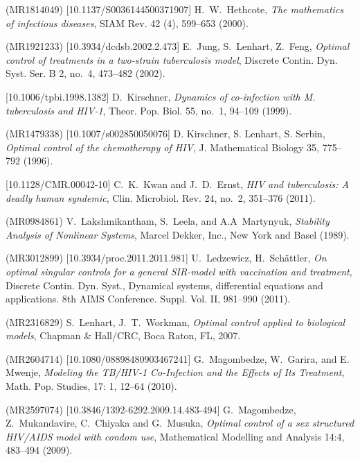 \documentclass{my_aims}
\theoremstyle{definition}
\begin{document}
\begin{thebibliography}{99}
 (MR1814049) [10.1137/S0036144500371907]
\newblock H.~W.~Hethcote,
\newblock \emph{The mathematics of infectious diseases},
\newblock SIAM Rev. 42 (4), 599--653 (2000).

 (MR1921233) [10.3934/dcdsb.2002.2.473]
\newblock E.~Jung, S.~Lenhart, Z.~Feng,
\newblock \emph{Optimal control of treatments in a two-strain tuberculosis model},
\newblock Discrete Contin. Dyn. Syst. Ser. B 2, no.~4, 473--482 (2002).

 [10.1006/tpbi.1998.1382]
\newblock D.~Kirschner,
\newblock \emph{Dynamics of co-infection with M. tuberculosis and HIV-1},
\newblock Theor. Pop. Biol. 55, no.~1, 94--109 (1999).

 (MR1479338) [10.1007/s002850050076]
\newblock D. Kirschner, S. Lenhart, S. Serbin,
\newblock \emph{Optimal control of the chemotherapy of HIV},
\newblock J. Mathematical Biology 35, 775--792 (1996).

 [10.1128/CMR.00042-10]
\newblock C.~K.~Kwan and J.~D.~Ernst,
\newblock \emph{HIV and tuberculosis: A deadly human syndemic},
\newblock Clin. Microbiol. Rev. 24, no.~2, 351--376 (2011).

 (MR0984861)
\newblock V.~Lakshmikantham, S.~Leela, and A.A~Martynyuk,
\newblock \emph{Stability Analysis of Nonlinear Systems},
\newblock Marcel Dekker, Inc., New York and Basel (1989).

 (MR3012899) [10.3934/proc.2011.2011.981]
\newblock U.~Ledzewicz, H.~Sch\"attler,
\newblock \emph{On optimal singular controls for a general
SIR-model with vaccination and treatment},
\newblock Discrete Contin. Dyn. Syst.,
\newblock Dynamical systems, differential equations and applications.
\newblock 8th AIMS Conference. Suppl. Vol. II, 981--990 (2011).

 (MR2316829)
\newblock S.~Lenhart, J.~T.~Workman,
\newblock \emph{Optimal control applied to biological models},
\newblock Chapman \& Hall/CRC, Boca Raton, FL, 2007.

 (MR2604714) [10.1080/08898480903467241]
\newblock G.~Magombedze, W.~Garira,  and E. Mwenje,
\newblock \emph{Modeling the TB/HIV-1 Co-Infection and the Effects of Its Treatment},
\newblock Math. Pop. Studies, 17: 1, 12--64 (2010).

 (MR2597074) [10.3846/1392-6292.2009.14.483-494]
\newblock G.~Magombedze, Z.~Mukandavire, C.~Chiyaka and G.~Musuka,
\newblock \emph{Optimal control of a sex structured HIV/AIDS model with condom use},
\newblock Mathematical Modelling and Analysis 14:4, 483--494 (2009).


\end{thebibliography}
\end{document}
